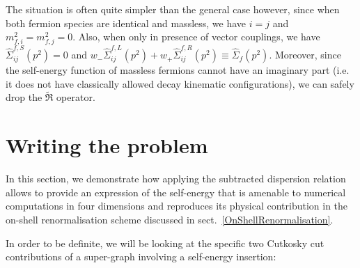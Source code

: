 \documentclass[11pt]{article}
\begin{document}
The situation is often quite simpler than the general case however, since when both fermion species are identical and massless, we have $i=j$ and $m_{f,i}^2=m_{f,j}^2=0$. Also, when only in presence of vector couplings, we have $\hat{\Sigma}_{ij}^{f,S}(p^2)=0$ and $w_- \hat{\Sigma}_{ij}^{f,L}(p^2) + w_+ \hat{\Sigma}_{ij}^{f,R}(p^2) \equiv \hat{\Sigma}_{f}(p^2)$.
Moreover, since the self-energy function of massless fermions cannot have an imaginary part (i.e. it does not have classically allowed decay kinematic configurations), we can safely drop the $ \tilde{\Re}$ operator.

\section{Writing the problem}

In this section, we demonstrate how applying the subtracted dispersion relation allows to provide an expression of the self-energy that is amenable to numerical computations in four dimensions and reproduces its physical contribution in the on-shell renormalisation scheme discussed in sect.~\ref{OnShellRenormalisation}.

In order to be definite, we will be looking at the specific two Cutkosky cut contributions of a super-graph involving a self-energy insertion:
\end{document}
